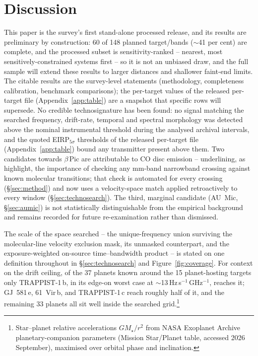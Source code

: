 \documentclass{openjournal}
\begin{document}
\section{Discussion}
\label{sec:discussion}
This paper is the survey's first stand-alone processed release, and
its results are preliminary by construction: 60 of 148 planned
target/bands ($\sim$41 per cent) are complete, and the processed
subset is sensitivity-ranked -- nearest, most sensitively-constrained
systems first -- so it is not an unbiased draw, and the full sample
will extend these results to larger distances and shallower faint-end
limits. The citable results are the survey-level statements
(methodology, completeness calibration, benchmark comparisons); the
per-target values of the released per-target file (Appendix~\ref{app:table}) are a snapshot that
specific rows will supersede. No credible technosignature has been
found: no signal matching the searched frequency, drift-rate,
temporal and spectral morphology was detected above the nominal
instrumental threshold during the analysed archival intervals, and
the quoted EIRP$_{5\sigma}$ thresholds of the released per-target file (Appendix~\ref{app:table}) bound
any transmitter present above them. Two candidates towards $\beta$\,Pic are attributable to
CO disc emission -- underlining, as \citet{Mason2024} highlight, the
importance of checking any mm-band narrowband crossing against known
molecular transitions; that check is automated for every crossing
(\S\ref{sec:method}) and now uses a velocity-space match applied
retroactively to every window (\S\ref{sec:technosearch}). The third,
marginal candidate (AU~Mic, \S\ref{sec:aumic}) is not statistically
distinguishable from the empirical background and remains recorded
for future re-examination rather than dismissed.

The scale of the space searched -- the unique-frequency union
surviving the molecular-line velocity exclusion mask, its unmasked
counterpart, and the exposure-weighted on-source time--bandwidth
product -- is stated on one definition throughout in
\S\ref{sec:technosearch} and Figure~\ref{fig:coverage}. For context
on the drift ceiling, of the
37 planets known around the 15 planet-hosting targets only
TRAPPIST-1\,b, in its edge-on worst case at
$\sim$13\,Hz\,s$^{-1}$\,GHz$^{-1}$, reaches it; GJ~581\,e,
61~Vir\,b, and TRAPPIST-1\,c reach roughly half of it, and the
remaining 33 planets all sit well inside the searched
grid.\footnote{Star--planet relative accelerations $GM_\star/r^{2}$
from NASA Exoplanet Archive planetary-companion parameters (Mission
Star/Planet table, accessed 2026 September), maximised over orbital
phase and inclination.}
\end{document}
